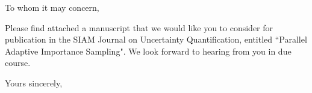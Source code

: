 \documentclass{letter}
\begin{document}
\date{}
\begin{letter}{ }

\opening{To whom it may concern,}

Please find attached a manuscript that we would like you to consider for publication in the SIAM Journal on  Uncertainty Quantification, entitled ``Parallel Adaptive Importance Sampling". We look forward to hearing from you in due course.

\closing{Yours sincerely,}
\end{letter}
\end{document}
